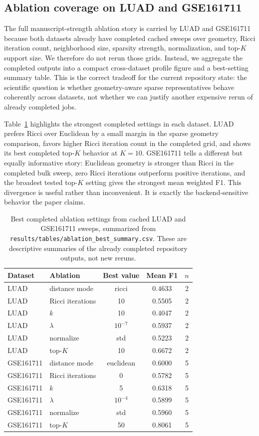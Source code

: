 \documentclass[11pt]{article}
\begin{document}
\subsection{Ablation coverage on LUAD and GSE161711}
The full manuscript-strength ablation story is carried by LUAD and GSE161711 because both datasets already have completed cached sweeps over geometry, Ricci iteration count, neighborhood size, sparsity strength, normalization, and top-$K$ support size. We therefore do not rerun those grids. Instead, we aggregate the completed outputs into a compact cross-dataset profile figure and a best-setting summary table. This is the correct tradeoff for the current repository state: the scientific question is whether geometry-aware sparse representatives behave coherently across datasets, not whether we can justify another expensive rerun of already completed jobs.

Table~\ref{tab:ablationbest} highlights the strongest completed settings in each dataset. LUAD prefers Ricci over Euclidean by a small margin in the sparse geometry comparison, favors higher Ricci iteration count in the completed grid, and shows its best completed top-$K$ behavior at $K=10$. GSE161711 tells a different but equally informative story: Euclidean geometry is stronger than Ricci in the completed bulk sweep, zero Ricci iterations outperform positive iterations, and the broadest tested top-$K$ setting gives the strongest mean weighted F1. This divergence is useful rather than inconvenient. It is exactly the backend-sensitive behavior the paper claims.

\begin{table}[h]
\centering
\small
\begin{tabular}{llccc}
\toprule
Dataset & Ablation & Best value & Mean F1 & $n$ \\
\midrule
LUAD & distance mode & ricci & 0.4633 & 2 \\
LUAD & Ricci iterations & 10 & 0.5505 & 2 \\
LUAD & $k$ & 10 & 0.4047 & 2 \\
LUAD & $\lambda$ & $10^{-7}$ & 0.5937 & 2 \\
LUAD & normalize & std & 0.5223 & 2 \\
LUAD & top-$K$ & 10 & 0.6672 & 2 \\
\midrule
GSE161711 & distance mode & euclidean & 0.6000 & 5 \\
GSE161711 & Ricci iterations & 0 & 0.5782 & 5 \\
GSE161711 & $k$ & 5 & 0.6318 & 5 \\
GSE161711 & $\lambda$ & $10^{-4}$ & 0.5899 & 5 \\
GSE161711 & normalize & std & 0.5960 & 5 \\
GSE161711 & top-$K$ & 50 & 0.8061 & 5 \\
\bottomrule
\end{tabular}
\caption{Best completed ablation settings from cached LUAD and GSE161711 sweeps, summarized from \texttt{results/tables/ablation\_best\_summary.csv}. These are descriptive summaries of the already completed repository outputs, not new reruns.}
\label{tab:ablationbest}
\end{table}
\end{document}
